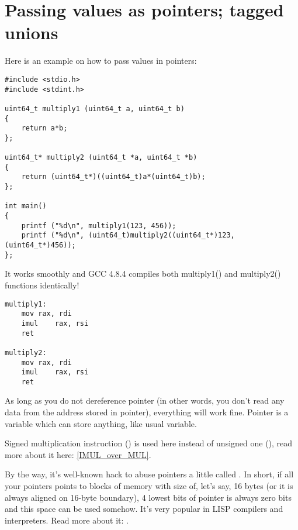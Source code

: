 \section{Passing values as pointers; tagged unions}

Here is an example on how to pass values in pointers:

\begin{lstlisting}[label=unsigned_multiply_C]
#include <stdio.h>
#include <stdint.h>

uint64_t multiply1 (uint64_t a, uint64_t b)
{
	return a*b;
};

uint64_t* multiply2 (uint64_t *a, uint64_t *b)
{
	return (uint64_t*)((uint64_t)a*(uint64_t)b);
};

int main()
{
	printf ("%d\n", multiply1(123, 456));
	printf ("%d\n", (uint64_t)multiply2((uint64_t*)123, (uint64_t*)456));
};
\end{lstlisting}

It works smoothly and GCC 4.8.4 compiles both multiply1() and multiply2() functions identically!

\begin{lstlisting}[label=unsigned_multiply_lst]
multiply1:
	mov	rax, rdi
	imul	rax, rsi
	ret

multiply2:
	mov	rax, rdi
	imul	rax, rsi
	ret
\end{lstlisting}

As long as you do not dereference pointer (in other words, you don't read any data from the address stored in pointer), everything will work fine.
Pointer is a variable which can store anything, like usual variable.

Signed multiplication instruction (\IMUL) is used here instead of unsigned one (\MUL), read more about it here:
\ref{IMUL_over_MUL}.

By the way, it's well-known hack to abuse pointers a little called .
In short, if all your pointers points to blocks of memory with size of, let's say, 16 bytes (or it is always aligned on 16-byte boundary), 4 lowest bits of pointer is always zero bits and this space
can be used somehow.
It's very popular in LISP compilers and interpreters.
Read more about it: \cite[1.3]{CBook}.


